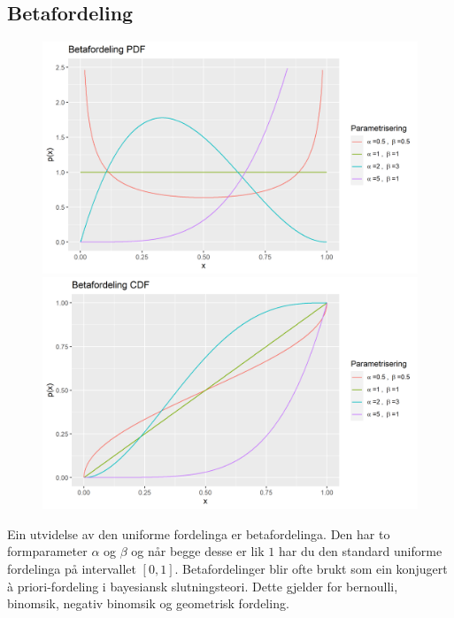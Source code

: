 \subsection{Betafordeling}
\begin{figure}[H]
  \centering
  \begin{minipage}[b]{0.49\textwidth}
\includegraphics[width=\textwidth]{bilete/betapdf.png}
  \end{minipage}
  \hfill
  \begin{minipage}[b]{0.49\textwidth}
    \includegraphics[width=\textwidth]{bilete/betacdf.png}
  \end{minipage}
\end{figure}

Ein utvidelse av den uniforme fordelinga er betafordelinga. Den har to formparameter $\alpha$ og $\beta$ og når begge desse er lik $1$ har du den standard uniforme fordelinga på intervallet $[0, 1]$. Betafordelinger blir ofte brukt som ein konjugert à priori-fordeling i bayesiansk slutningsteori. Dette gjelder for bernoulli, binomsik, negativ binomsik og geometrisk fordeling.

